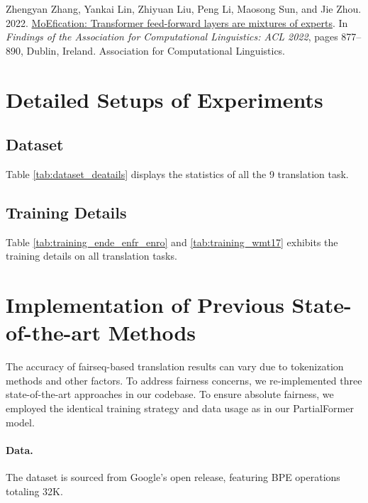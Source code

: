 \documentclass[11pt]{article}
\begin{document}
\begin{thebibliography}{49}
Zhengyan Zhang, Yankai Lin, Zhiyuan Liu, Peng Li, Maosong Sun, and Jie Zhou. 2022.
\newblock \href {https://doi.org/10.18653/v1/2022.findings-acl.71} {{M}o{E}fication: Transformer feed-forward layers are mixtures of experts}.
\newblock In \emph{Findings of the Association for Computational Linguistics: ACL 2022}, pages 877--890, Dublin, Ireland. Association for Computational Linguistics.

\end{thebibliography}
 

\newpage

\appendix
\section{Detailed Setups of Experiments}
\label{sec:detailed_settup}

\subsection{Dataset}
Table \ref{tab:dataset_deatails} displays the statistics of all the 9 translation task.

\subsection{Training Details}
Table \ref{tab:training_ende_enfr_enro} and \ref{tab:training_wmt17} exhibits the training details on all translation tasks.









\section{Implementation of Previous State-of-the-art Methods}
The accuracy of fairseq-based translation results can vary due to tokenization methods and other factors. To address fairness concerns, we re-implemented three state-of-the-art approaches in our codebase. To ensure absolute fairness, we employed the identical training strategy and data usage as in our PartialFormer model.

\paragraph{Data.} The dataset is sourced from Google's open release, featuring BPE operations totaling 32K. 
\end{document}
